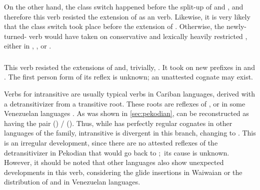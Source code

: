 On the other hand, the class switch happened before the split-up of \trio and \akuriyo, and therefore this verb resisted the extension of \akuriyo {} as an  verb.
Likewise, it is very likely that the class switch took place before the extension of \PPek {}.
Otherwise, the newly-turned- verb would have taken on conservative and lexically heavily restricted , either in \PPek, \PXin, or \arara.

\subsubsection{ }
\label{sec:bathe}
This verb resisted the extensions of \PPek {}  and, trivially, \akuriyo {} .
It took on new  prefixes in \PTir {} and \PWai {}.
The first person form of its \carijo reflex  \parencites[72]{koch1908hiana} is unknown; an unattested \yukpa cognate may exist.

Verbs for intransitive  are usually typical  verbs in Cariban languages, derived with a detransitivizer from a transitive root.
These roots are reflexes of , or  in some Venezuelan languages .
As was shown in \cref{sec:pekodian}, \PPek can be reconstructed as having the pair  () /  ().
Thus, while \PPek {} has perfectly regular cognates in other languages of the family, intransitive  is divergent in this branch, changing  to .
This is an irregular development, since there are no attested reflexes of the detransitivizer in Pekodian that would go back to \PPek {} \parencite[506]{meira2010origin}; its cause is unknown.
However, it should be noted that other languages also show unexpected developments in this verb, considering the glide insertions in Waiwaian or the distribution of  and  in Venezuelan languages.




